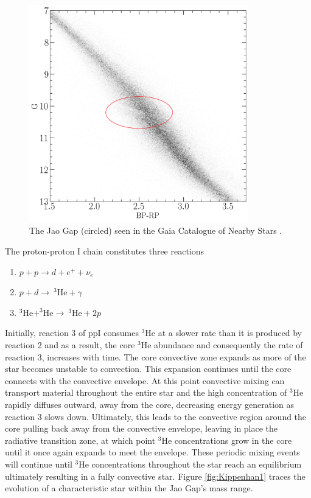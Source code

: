 \begin{figure}
	\centering
	\includegraphics[width=0.85\textwidth]{figures/jaoOpacity/JaoGapEDR3.png}
	\caption{The Jao Gap (circled) seen in the Gaia Catalogue of Nearby Stars \citep{GaiaCollaboration2021}.}
	\label{fig:JaoGap}
\end{figure}

The proton-proton I chain constitutes three reactions 
\begin{enumerate} 
	\item $p + p \longrightarrow d + e^{+} + \nu_{e}$
	\item $p + d \longrightarrow \ ^{3}\text{He} + \gamma$
	\item $^{3}\text{He} + ^{3}\text{He} \longrightarrow \ ^{3}\text{He} + 2p$ 
\end{enumerate} 
Initially, reaction 3 of ppI consumes $^{3}$He at a slower rate than it is
produced by reaction 2 and as a result, the core $^{3}$He abundance and
consequently the rate of reaction 3, increases with time. The core convective
zone expands as more of the star becomes unstable to convection. This expansion
continues until the core connects with the convective envelope. At this point
convective mixing can transport material throughout the entire star and the
high concentration of $^{3}$He rapidly diffuses outward, away from the core,
decreasing energy generation as reaction 3 slows down. Ultimately, this leads
to the convective region around the core pulling back away from the convective
envelope, leaving in place the radiative transition zone, at which point
$^{3}$He concentrations grow in the core until it once again expands to meet
the envelope.  These periodic mixing events will continue until $^{3}$He
concentrations throughout the star reach an equilibrium ultimately resulting in
a fully convective star. Figure \ref{fig:Kippenhan1} traces the evolution of a
characteristic star within the Jao Gap's mass range.

